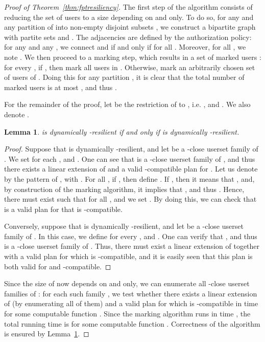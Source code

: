 \documentclass[jcs,crcready]{iosart1c}
\newtheorem{lemma}{Lemma}
\begin{document}
\begin{proof}[Proof of Theorem~\ref{thm:fptresiliency}]
The first step of the algorithm consists of reducing the set of users to a size depending on  and  only.
To do so, for any  and any partition  of  into  non-empty disjoint subsets , we construct a bipartite graph  with partite sets  and . 
The adjacencies are defined by the authorization policy: for any  and any , we connect  and  if and only if  for all . Moreover, for all , we note . 
We then proceed to a marking step, which results in a set of marked users : 
for every , if , then mark all users in . Otherwise, mark an arbitrarily chosen set of  users of . 
Doing this for any partition , it is clear that the total number of marked users is at most , and thus . 

For the remainder of the proof, let  be the restriction of  to , i.e. , and . We also denote .

\begin{lemma}\label{lemma:equivsol}
 is dynamically -resilient if and only if  is dynamically -resilient.
\end{lemma}
\begin{proof}
Suppose that  is dynamically -resilient, and let  be  a -close userset family of . We set  for each , and . One can see that  is a -close userset family of , and thus there exists a linear extension  of  and a valid -compatible plan  for . Let us denote by  the pattern of , with . For all , if , then define . If , then it means that , and, by construction of the marking algorithm, it implies that , and thus . Hence, there must exist  such that  for all , and we set . By doing this, we can check that  is a valid plan for  that is -compatible.

Conversely, suppose that  is dynamically -resilient, and let  be a -close userset family of . In this case, we define  for every , and . One can verify that , and thus  is a -close userset family of . Thus, there must exist a linear extension  of  together with a valid plan  for  which is -compatible, and it is easily seen that this plan is both valid for  and -compatible.
\end{proof}

Since the size of  now depends on  and  only, we can enumerate all -close userset families of : for each such family , we test whether there exists a linear extension  of  (by enumerating all of them) and a valid plan for  which is -compatible in time  for some computable function . Since the marking algorithm runs in time , the total running time is  for some computable function . Correctness of the algorithm is ensured by Lemma~\ref{lemma:equivsol}.
\end{proof}
\end{document}
